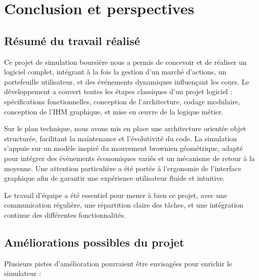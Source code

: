 \newpage
\section{Conclusion et perspectives}
\label{sec:conclusion}

\subsection{Résumé du travail réalisé}

Ce projet de simulation boursière nous a permis de concevoir et de réaliser un logiciel complet, intégrant à la fois la gestion d'un marché d'actions, un portefeuille utilisateur, et des événements dynamiques influençant les cours.  
Le développement a couvert toutes les étapes classiques d'un projet logiciel : spécifications fonctionnelles, conception de l'architecture, codage modulaire, conception de l'IHM graphique, et mise en œuvre de la logique métier.

Sur le plan technique, nous avons mis en place une architecture orientée objet structurée, facilitant la maintenance et l'évolutivité du code.  
La simulation s'appuie sur un modèle inspiré du mouvement brownien géométrique, adapté pour intégrer des événements économiques variés et un mécanisme de retour à la moyenne.  
Une attention particulière a été portée à l'ergonomie de l'interface graphique afin de garantir une expérience utilisateur fluide et intuitive.

Le travail d'équipe a été essentiel pour mener à bien ce projet, avec une communication régulière, une répartition claire des tâches, et une intégration continue des différentes fonctionnalités.

\subsection{Améliorations possibles du projet}

Plusieurs pistes d'amélioration pourraient être envisagées pour enrichir le simulateur :

